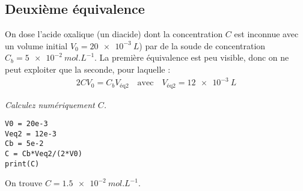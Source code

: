\subsection{Deuxième équivalence}
On dose l'acide oxalique (un diacide) dont la concentration $C$ est inconnue avec un volume initial $V_0=\SI{20e-3}{L}$) par de la soude de concentration $C_b=\SI{5e-2}{mol.L^{-1}}$. La première équivalence est peu visible, donc on ne peut exploiter que la seconde, pour laquelle :
	\begin{align*}
	2CV_0=C_bV_\text{éq2}
	\quad\text{avec}\quad
	V_\text{éq2}=\SI{12e-3}{L}
	\end{align*}
\begin{Exercise}
{\it Calculez numériquement $C$.}
\end{Exercise}
\begin{Answer}
\begin{lstlisting}
V0 = 20e-3
Veq2 = 12e-3
Cb = 5e-2
C = Cb*Veq2/(2*V0)
print(C)
\end{lstlisting}
On trouve $C=\SI{1,5e-2}{mol.L^{-1}}$.
\end{Answer} 
